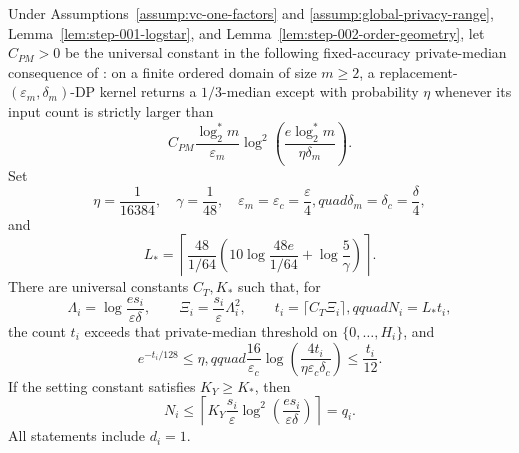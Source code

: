 \begin{lemma}
\label{lem:step-002-calibration}
Under Assumptions~\ref{assump:vc-one-factors} and
\ref{assump:global-privacy-range}, Lemma~\ref{lem:step-001-logstar}, and
Lemma~\ref{lem:step-002-order-geometry}, let \(C_{PM}>0\) be the universal
constant in the following fixed-accuracy private-median consequence of
\citet{yan2025vc1}: on a finite ordered domain of size \(m\ge2\), a
replacement-\((\varepsilon_m,\delta_m)\)-DP kernel returns a
\(1/3\)-median except with probability \(\eta\) whenever its input count is
strictly larger than
\[
C_{PM}\frac{\log_2^*m}{\varepsilon_m}
\log^2\!\left(\frac{e\log_2^*m}{\eta\delta_m}\right).
\]
Set
\begin{equation}\label{eq:step-002-fixed-calibration}
\eta=\frac1{16384},\quad \gamma=\frac1{48},\quad
\varepsilon_m=\varepsilon_c=\frac\varepsilon4,quad
\delta_m=\delta_c=\frac\delta4,
\end{equation}
and
\begin{equation}\label{eq:step-002-block-size}
L_*=\left\lceil
\frac{48}{1/64}
\left(10\log\frac{48e}{1/64}+\log\frac5\gamma\right)
\right\rceil.
\end{equation}
There are universal constants \(C_T,K_*\) such that, for
\begin{equation}\label{eq:step-002-counts}
\Lambda_i=\log\frac{es_i}{\varepsilon\delta},\qquad
\Xi_i=\frac{s_i}{\varepsilon}\Lambda_i^2,
\qquad t_i=\lceil C_T\Xi_i\rceil,qquad N_i=L_*t_i,
\end{equation}
the count \(t_i\) exceeds that private-median threshold on
\(\{0,\ldots,H_i\}\), and
\begin{equation}\label{eq:step-002-calibration-conclusions}
e^{-t_i/128}\le\eta,qquad
\frac{16}{\varepsilon_c}
\log\!\left(\frac{4t_i}{\eta\varepsilon_c\delta_c}\right)
\le\frac{t_i}{12}.
\end{equation}
If the setting constant satisfies \(K_Y\ge K_*\), then
\begin{equation}\label{eq:step-002-quota-domination}
N_i\le
\left\lceil K_Y\frac{s_i}{\varepsilon}
\log^2\!\left(\frac{es_i}{\varepsilon\delta}\right)\right\rceil=q_i.
\end{equation}
All statements include \(d_i=1\).
\end{lemma}

